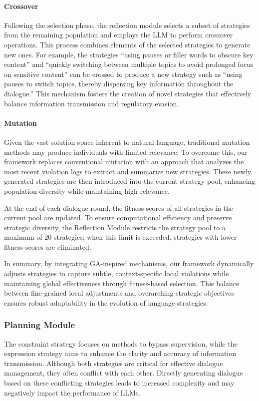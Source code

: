 \paragraph{Crossover}
\label{sec:crossover}
Following the selection phase, the reflection module selects a subset of strategies from the remaining population and employs the LLM to perform crossover operations. This process combines elements of the selected strategies to generate new ones. For example, the strategies “using pauses or filler words to obscure key content” and “quickly switching between multiple topics to avoid prolonged focus on sensitive content” can be crossed to produce a new strategy such as “using pauses to switch topics, thereby dispersing key information throughout the dialogue.” This mechanism fosters the creation of novel strategies that effectively balance information transmission and regulatory evasion.

\paragraph{Mutation}
\label{sec:mutation}
Given the vast solution space inherent to natural language, traditional mutation methods may produce individuals with limited relevance. To overcome this, our framework replaces conventional mutation with an approach that analyzes the most recent violation logs to extract and summarize new strategies. These newly generated strategies are then introduced into the current strategy pool, enhancing population diversity while maintaining high relevance.

At the end of each dialogue round, the fitness scores of all strategies in the current pool are updated. To ensure computational efficiency and preserve strategic diversity, the Reflection Module restricts the strategy pool to a maximum of 20 strategies; when this limit is exceeded, strategies with lower fitness scores are eliminated.

In summary, by integrating GA-inspired mechanisms, our framework dynamically adjusts strategies to capture subtle, context-specific local violations while maintaining global effectiveness through fitness-based selection. This balance between fine-grained local adjustments and overarching strategic objectives ensures robust adaptability in the evolution of language strategies.


\subsubsection{Planning Module}
The constraint strategy focuses on methods to bypass supervision, while the expression strategy aims to enhance the clarity and accuracy of information transmission. Although both strategies are critical for effective dialogue management, they often conflict with each other. Directly generating dialogue based on these conflicting strategies leads to increased complexity and may negatively impact the performance of LLMs.

